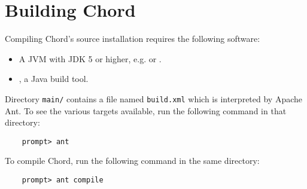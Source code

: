 \section{Building Chord}
\label{sec:building-chord}

Compiling Chord's source installation requires the following software:

\begin{itemize}
\item
A JVM with JDK 5 or higher, e.g.  or
.
\item
{}, a Java build tool.
\end{itemize}

Directory {\tt main/} contains a file named {\tt build.xml} which is
interpreted by Apache Ant.  To see the various targets available, run
the following command in that directory:

\begin{verbatim}
    prompt> ant
\end{verbatim}

To compile Chord, run the following command in the same directory:

\begin{verbatim}
    prompt> ant compile
\end{verbatim}

